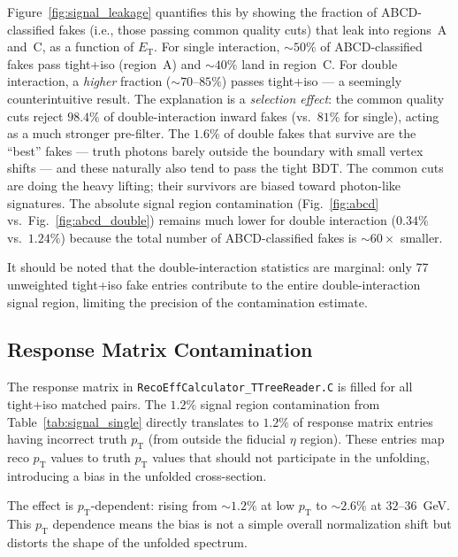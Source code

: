 \documentclass[11pt,letterpaper]{article}
\newcommand{\pT}{\ensuremath{p_{\text{T}}}}
\newcommand{\ET}{\ensuremath{E_{\text{T}}}}
\begin{document}
Figure~\ref{fig:signal_leakage} quantifies this by showing the fraction of
ABCD-classified fakes (i.e., those passing common quality cuts) that leak into
regions~A and~C, as a function of $\ET$.
For single interaction, $\sim\!50\%$ of ABCD-classified fakes pass tight+iso
(region~A) and $\sim\!40\%$ land in region~C. For double interaction, a
\emph{higher} fraction ($\sim\!70$--$85\%$) passes tight+iso --- a seemingly
counterintuitive result. The explanation is a \emph{selection effect}: the
common quality cuts reject $98.4\%$ of double-interaction inward fakes (vs.\
$81\%$ for single), acting as a much stronger pre-filter. The $1.6\%$ of double
fakes that survive are the ``best'' fakes --- truth photons barely outside the
boundary with small vertex shifts --- and these naturally also tend to pass the
tight BDT. The common cuts are doing the heavy lifting; their survivors are
biased toward photon-like signatures. The absolute signal region contamination
(Fig.~\ref{fig:abcd} vs.\ Fig.~\ref{fig:abcd_double}) remains much lower for
double interaction ($0.34\%$ vs.\ $1.24\%$) because the total number of
ABCD-classified fakes is ${\sim}60\times$ smaller.

It should be noted that the double-interaction statistics are marginal: only 77
unweighted tight+iso fake entries contribute to the entire double-interaction
signal region, limiting the precision of the contamination estimate.

\subsection{Response Matrix Contamination}
\label{sec:response}

The response matrix in \texttt{RecoEffCalculator\_TTreeReader.C} is filled for
all tight+iso matched pairs. The $1.2\%$ signal region contamination from
Table~\ref{tab:signal_single} directly translates to $1.2\%$ of response matrix
entries having incorrect truth $\pT$ (from outside the fiducial $\eta$ region).
These entries map reco $\pT$ values to truth $\pT$ values that should not
participate in the unfolding, introducing a bias in the unfolded cross-section.

The effect is $\pT$-dependent: rising from ${\sim}1.2\%$ at low $\pT$ to
${\sim}2.6\%$ at $32$--$36$~GeV. This $\pT$ dependence means the bias is not a
simple overall normalization shift but distorts the shape of the unfolded
spectrum.

\end{document}
